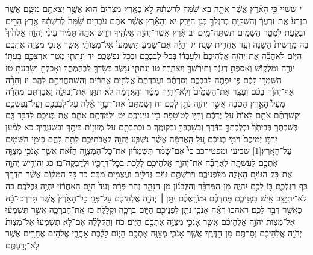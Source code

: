 \documentclass[twoside, openany, parskip=half, 11pt]{book}
\begin{document}
י ששיי כִּ֣י הָאָ֗רֶץ אֲשֶׁ֨ר אַתָּ֤ה בָא־שָׁ֙מָּה֙ לְרִשְׁתָּ֔הּ לֹ֣א כְאֶ֤רֶץ מִצְרַ֙יִם֙ הִ֔וא אֲשֶׁ֥ר יְצָאתֶ֖ם מִשָּׁ֑ם אֲשֶׁ֤ר תִּזְרַע֙ אֶֽת־זַרְעֲךָ֔ וְהִשְׁקִ֥יתָ בְרַגְלְךָ֖ כְּגַ֥ן הַיָּרָֽק׃ יא וְהָאָ֗רֶץ אֲשֶׁ֨ר אַתֶּ֜ם עֹבְרִ֥ים שָׁ֙מָּה֙ לְרִשְׁתָּ֔הּ אֶ֥רֶץ הָרִ֖ים וּבְקָעֹ֑ת לִמְטַ֥ר הַשָּׁמַ֖יִם תִּשְׁתֶּה־מָּֽיִם׃ יב אֶ֕רֶץ אֲשֶׁר־יְהֹוָ֥ה אֱלֹהֶ֖יךָ דֹּרֵ֣שׁ אֹתָ֑הּ תָּמִ֗יד עֵינֵ֨י יְהֹוָ֤ה אֱלֹהֶ֙יךָ֙ בָּ֔הּ מֵֽרֵשִׁית֙ הַשָּׁנָ֔ה וְעַ֖ד אַחֲרִ֥ית שָׁנָֽה׃
יג וְהָיָ֗ה אִם־שָׁמֹ֤עַ תִּשְׁמְעוּ֙ אֶל־מִצְוֺתַ֔י אֲשֶׁ֧ר אָנֹכִ֛י מְצַוֶּ֥ה אֶתְכֶ֖ם הַיּ֑וֹם לְאַהֲבָ֞ה אֶת־יְהֹוָ֤ה אֱלֹֽהֵיכֶם֙ וּלְעׇבְד֔וֹ בְּכׇל־לְבַבְכֶ֖ם וּבְכׇל־נַפְשְׁכֶֽם׃ יד וְנָתַתִּ֧י מְטַֽר־אַרְצְכֶ֛ם בְּעִתּ֖וֹ יוֹרֶ֣ה וּמַלְק֑וֹשׁ וְאָסַפְתָּ֣ דְגָנֶ֔ךָ וְתִירֹֽשְׁךָ֖ וְיִצְהָרֶֽךָ׃ טו וְנָתַתִּ֛י עֵ֥שֶׂב בְּשָׂדְךָ֖ לִבְהֶמְתֶּ֑ךָ וְאָכַלְתָּ֖ וְשָׂבָֽעְתָּ׃ טז הִשָּֽׁמְר֣וּ לָכֶ֔ם פֶּ֥ן יִפְתֶּ֖ה לְבַבְכֶ֑ם וְסַרְתֶּ֗ם וַעֲבַדְתֶּם֙ אֱלֹהִ֣ים אֲחֵרִ֔ים וְהִשְׁתַּחֲוִיתֶ֖ם לָהֶֽם׃ יז וְחָרָ֨ה אַף־יְהֹוָ֜ה בָּכֶ֗ם וְעָצַ֤ר אֶת־הַשָּׁמַ֙יִם֙ וְלֹֽא־יִהְיֶ֣ה מָטָ֔ר וְהָ֣אֲדָמָ֔ה לֹ֥א תִתֵּ֖ן אֶת־יְבוּלָ֑הּ וַאֲבַדְתֶּ֣ם מְהֵרָ֗ה מֵעַל֙ הָאָ֣רֶץ הַטֹּבָ֔ה אֲשֶׁ֥ר יְהֹוָ֖ה נֹתֵ֥ן לָכֶֽם׃ יח וְשַׂמְתֶּם֙ אֶת־דְּבָרַ֣י אֵ֔לֶּה עַל־לְבַבְכֶ֖ם וְעַֽל־נַפְשְׁכֶ֑ם וּקְשַׁרְתֶּ֨ם אֹתָ֤ם לְאוֹת֙ עַל־יֶדְכֶ֔ם וְהָי֥וּ לְטוֹטָפֹ֖ת בֵּ֥ין עֵינֵיכֶֽם׃ יט וְלִמַּדְתֶּ֥ם אֹתָ֛ם אֶת־בְּנֵיכֶ֖ם לְדַבֵּ֣ר בָּ֑ם בְּשִׁבְתְּךָ֤ בְּבֵיתֶ֙ךָ֙ וּבְלֶכְתְּךָ֣ בַדֶּ֔רֶךְ וּֽבְשׇׁכְבְּךָ֖ וּבְקוּמֶֽךָ׃ כ וּכְתַבְתָּ֛ם עַל־מְזוּז֥וֹת בֵּיתֶ֖ךָ וּבִשְׁעָרֶֽיךָ׃ כא לְמַ֨עַן יִרְבּ֤וּ יְמֵיכֶם֙ וִימֵ֣י בְנֵיכֶ֔ם עַ֚ל הָֽאֲדָמָ֔ה אֲשֶׁ֨ר נִשְׁבַּ֧ע יְהֹוָ֛ה לַאֲבֹתֵיכֶ֖ם לָתֵ֣ת לָהֶ֑ם כִּימֵ֥י הַשָּׁמַ֖יִם עַל־הָאָֽרֶץ׃‏[1]
שביעי ומפטירכב כִּי֩ אִם־שָׁמֹ֨ר תִּשְׁמְר֜וּן אֶת־כׇּל־הַמִּצְוָ֣ה הַזֹּ֗את אֲשֶׁ֧ר אָנֹכִ֛י מְצַוֶּ֥ה אֶתְכֶ֖ם לַעֲשֹׂתָ֑הּ לְאַהֲבָ֞ה אֶת־יְהֹוָ֧ה אֱלֹהֵיכֶ֛ם לָלֶ֥כֶת בְּכׇל־דְּרָכָ֖יו וּלְדׇבְקָה־בֽוֹ׃ כג וְהוֹרִ֧ישׁ יְהֹוָ֛ה אֶת־כׇּל־הַגּוֹיִ֥ם הָאֵ֖לֶּה מִלִּפְנֵיכֶ֑ם וִֽירִשְׁתֶּ֣ם גּוֹיִ֔ם גְּדֹלִ֥ים וַעֲצֻמִ֖ים מִכֶּֽם׃ כד כׇּל־הַמָּק֗וֹם אֲשֶׁ֨ר תִּדְרֹ֧ךְ כַּֽף־רַגְלְכֶ֛ם בּ֖וֹ לָכֶ֣ם יִהְיֶ֑ה מִן־הַמִּדְבָּ֨ר וְהַלְּבָנ֜וֹן מִן־הַנָּהָ֣ר נְהַר־פְּרָ֗ת וְעַד֙ הַיָּ֣ם הָאַֽחֲר֔וֹן יִהְיֶ֖ה גְּבֻלְכֶֽם׃ כה לֹא־יִתְיַצֵּ֥ב אִ֖ישׁ בִּפְנֵיכֶ֑ם פַּחְדְּכֶ֨ם וּמוֹרַֽאֲכֶ֜ם יִתֵּ֣ן ׀ יְהֹוָ֣ה אֱלֹֽהֵיכֶ֗ם עַל־פְּנֵ֤י כׇל־הָאָ֙רֶץ֙ אֲשֶׁ֣ר תִּדְרְכוּ־בָ֔הּ כַּאֲשֶׁ֖ר דִּבֶּ֥ר לָכֶֽם׃
ראהכו רְאֵ֗ה אָנֹכִ֛י נֹתֵ֥ן לִפְנֵיכֶ֖ם הַיּ֑וֹם בְּרָכָ֖ה וּקְלָלָֽה׃ כז אֶֽת־הַבְּרָכָ֑ה אֲשֶׁ֣ר תִּשְׁמְע֗וּ אֶל־מִצְוֺת֙ יְהֹוָ֣ה אֱלֹֽהֵיכֶ֔ם אֲשֶׁ֧ר אָנֹכִ֛י מְצַוֶּ֥ה אֶתְכֶ֖ם הַיּֽוֹם׃ כח וְהַקְּלָלָ֗ה אִם־לֹ֤א תִשְׁמְעוּ֙ אֶל־מִצְוֺת֙ יְהֹוָ֣ה אֱלֹֽהֵיכֶ֔ם וְסַרְתֶּ֣ם מִן־הַדֶּ֔רֶךְ אֲשֶׁ֧ר אָנֹכִ֛י מְצַוֶּ֥ה אֶתְכֶ֖ם הַיּ֑וֹם לָלֶ֗כֶת אַחֲרֵ֛י אֱלֹהִ֥ים אֲחֵרִ֖ים אֲשֶׁ֥ר לֹֽא־יְדַעְתֶּֽם׃
\end{document}
